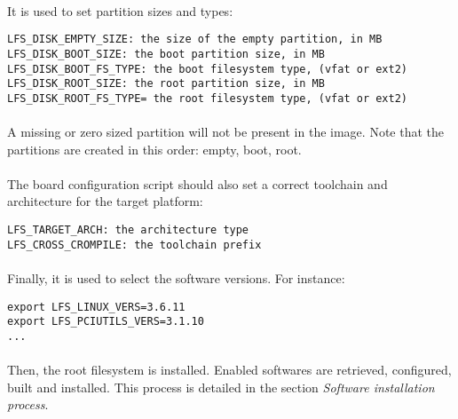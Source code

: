 \documentclass[a4paper, 11pt]{article}
\begin{document}
\paragraph{}
It is used to set partition sizes and types:\\

\begin{lstlisting}[frame=tb]
LFS_DISK_EMPTY_SIZE: the size of the empty partition, in MB
LFS_DISK_BOOT_SIZE: the boot partition size, in MB
LFS_DISK_BOOT_FS_TYPE: the boot filesystem type, (vfat or ext2)
LFS_DISK_ROOT_SIZE: the root partition size, in MB
LFS_DISK_ROOT_FS_TYPE= the root filesystem type, (vfat or ext2)
\end{lstlisting}

\paragraph{}
A missing or zero sized partition will not be present in the image. Note that
the partitions are created in this order: empty, boot, root.

\paragraph{}
The board configuration script should also set a correct toolchain and
architecture for the target platform:\\

\begin{lstlisting}[frame=tb]
LFS_TARGET_ARCH: the architecture type
LFS_CROSS_CROMPILE: the toolchain prefix
\end{lstlisting}

\paragraph{}
Finally, it is used to select the software versions. For instance:\\
\begin{lstlisting}[frame=tb]
export LFS_LINUX_VERS=3.6.11
export LFS_PCIUTILS_VERS=3.1.10
...
\end{lstlisting}

\paragraph{}
Then, the root filesystem is installed. Enabled softwares are retrieved,
configured, built and installed. This process is detailed in the section
\textit{Software installation process}.
\end{document}
